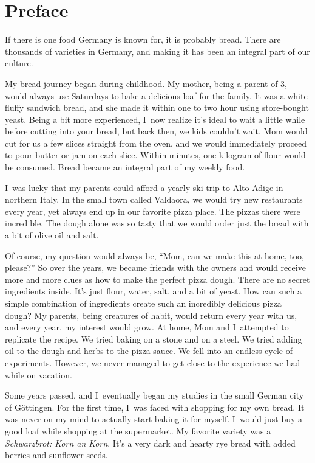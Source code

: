 \chapter{Preface}%
\label{ch:Preface}

If there is one food Germany is known for, it is probably bread.
There are thousands of varieties in Germany,
and making it has been an integral part of our culture.

My bread journey began during childhood. My mother, being a parent
of 3, would always use Saturdays to bake a delicious loaf for the family.
It was a white fluffy sandwich bread, and she made it within one to two hour using store-bought yeast.
Being a bit more experienced, I~now realize it's
ideal to wait a little while before cutting into your bread, but back then,
we kids couldn't wait. Mom would cut for us a few slices straight from the oven, and we would
immediately proceed to pour butter or jam on each slice. Within minutes,
one kilogram of flour would be consumed. Bread became an integral part of my
weekly food.

I~was lucky that my parents could afford a yearly ski trip to
Alto Adige in northern Italy. In the small town called Valdaora, we
would try new restaurants every year, yet always end up in our favorite
pizza place. The pizzas there were incredible. The dough
alone was so tasty that we would order just the bread with a
bit of olive oil and salt.

Of course, my question would always be, ``Mom, can we make this at home, too, please?''
So over the years, we became friends with the owners and would receive
more and more clues as how to make the perfect pizza dough. There
are no secret ingredients inside. It's just flour, water, salt, and a bit of yeast.
How can such a simple combination of ingredients create such an incredibly delicious
pizza dough? My parents, being creatures of habit, would return every year with us,
and every year, my interest would grow. At home, Mom and I~attempted to replicate
the recipe. We tried baking on a stone and on a steel. We tried adding oil to the dough and herbs
to the pizza sauce. We fell into an endless cycle of experiments. However, we never managed
to get close to the experience we had while on vacation.

Some years passed, and I~eventually began my studies in the small German city of Göttingen.
For the first time, I~was faced with shopping for my own bread. It was never
on my mind to actually start baking it for myself. I~would just buy
a good loaf while shopping at the supermarket. My favorite variety
was a \emph{Schwarzbrot: Korn an Korn}. It’s a very dark and hearty rye bread
with added berries and sunflower seeds.

